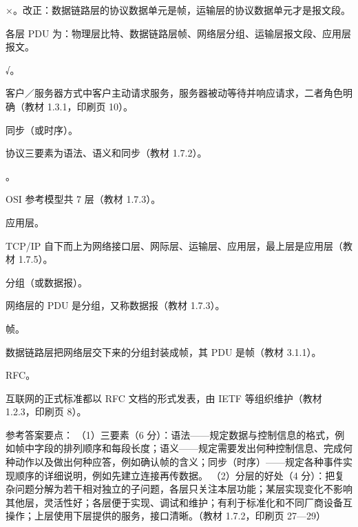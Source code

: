 \documentclass[a4paper,11pt]{article}
\begin{document}
\q ×。改正：数据链路层的协议数据单元是帧，运输层的协议数据单元才是报文段。\begin{analysis}各层 PDU 为：物理层比特、数据链路层帧、网络层分组、运输层报文段、应用层报文。\end{analysis}

\q √。\begin{analysis}客户／服务器方式中客户主动请求服务，服务器被动等待并响应请求，二者角色明确（教材 1.3.1，印刷页 10）。\end{analysis}


\q 同步（或时序）。\begin{analysis}协议三要素为语法、语义和同步（教材 1.7.2）。\end{analysis}

。\begin{analysis}OSI 参考模型共 7 层（教材 1.7.3）。\end{analysis}

\q 应用层。\begin{analysis}TCP/IP 自下而上为网络接口层、网际层、运输层、应用层，最上层是应用层（教材 1.7.5）。\end{analysis}

\q 分组（或数据报）。\begin{analysis}网络层的 PDU 是分组，又称数据报（教材 1.7.3）。\end{analysis}

\q 帧。\begin{analysis}数据链路层把网络层交下来的分组封装成帧，其 PDU 是帧（教材 3.1.1）。\end{analysis}

\q RFC。\begin{analysis}互联网的正式标准都以 RFC 文档的形式发表，由 IETF 等组织维护（教材 1.2.3，印刷页 8）。\end{analysis}


\q 参考答案要点：
（1）三要素（6 分）：语法——规定数据与控制信息的格式，例如帧中字段的排列顺序和每段长度；语义——规定需要发出何种控制信息、完成何种动作以及做出何种应答，例如确认帧的含义；同步（时序）——规定各种事件实现顺序的详细说明，例如先建立连接再传数据。
（2）分层的好处（4 分）：把复杂问题分解为若干相对独立的子问题，各层只关注本层功能；某层实现变化不影响其他层，灵活性好；各层便于实现、调试和维护；有利于标准化和不同厂商设备互操作；上层使用下层提供的服务，接口清晰。（教材 1.7.2，印刷页 27—29）
\end{document}
